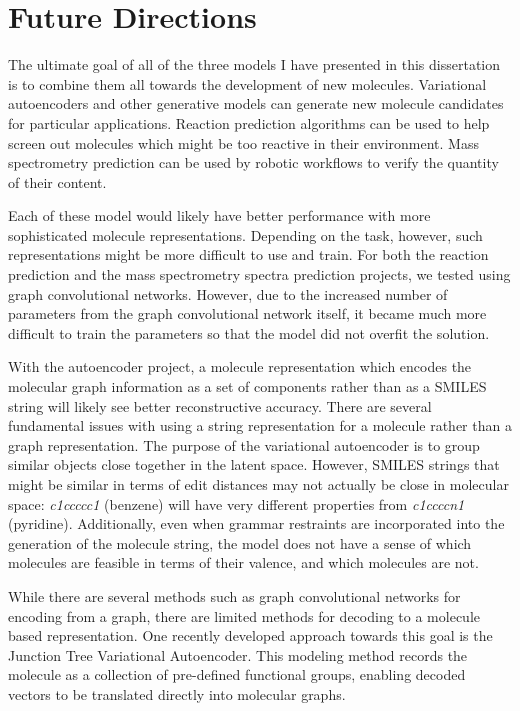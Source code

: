\chapter{Future Directions}\label{ch:future_directions}
\dsp

The ultimate goal of all of the three models I have presented in this dissertation is to combine them all towards the development of new molecules. Variational autoencoders and other generative models can generate new molecule candidates for particular applications. Reaction prediction algorithms can be used to help screen out molecules which might be too reactive in their environment. Mass spectrometry prediction can be used by robotic workflows to verify the quantity of their content. 

Each of these model would likely have better performance with more sophisticated molecule representations. Depending on the task, however, such representations might be more difficult to use and train. For both the reaction prediction and the mass spectrometry spectra prediction projects, we tested using graph convolutional networks. However, due to the increased number of parameters from the graph convolutional network itself, it became much more difficult to train the parameters so that the model did not overfit the solution. 

With the autoencoder project, a molecule representation which encodes the molecular graph information as a set of components rather than as a SMILES string will likely see better reconstructive accuracy. There are several fundamental issues with using a string representation for a molecule rather than a graph representation. The purpose of the variational autoencoder is to group similar objects close together in the latent space. However, SMILES strings that might be similar in terms of edit distances may not actually be close in molecular space: \textit{c1ccccc1} (benzene) will have very different properties from \textit{c1ccccn1} (pyridine). Additionally, even when grammar restraints are incorporated into the generation of the molecule string\cite{kusner2017grammar}, the model does not have a sense of which molecules are feasible in terms of their valence, and which molecules are not.

While there are several methods such as graph convolutional networks for encoding from a graph, there are limited methods for decoding to a molecule based representation. One recently developed approach towards this goal is the Junction Tree Variational Autoencoder\cite{jin2018junction}. This modeling method records the molecule as a collection of pre-defined functional groups, enabling decoded vectors to be translated directly into molecular graphs. 

